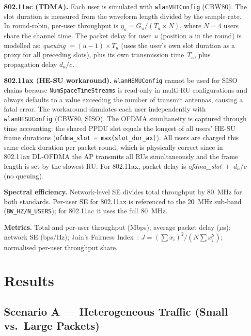 \documentclass[twocolumn]{article}
\begin{document}
\textbf{802.11ac (TDMA).}
Each user is simulated with \texttt{wlanVHTConfig} (CBW80). The slot
duration is measured from the waveform length divided by the sample rate.
In round-robin, per-user throughput is $\eta_u = G_u / (T_u \times N)$,
where $N=4$ users share the channel time. The packet delay for user~$u$
(position $u$ in the round) is modelled as:
\textit{queuing} $= (u-1) \times T_u$ (uses the user's own slot duration
as a proxy for all preceding slots), plus its own transmission time~$T_u$,
plus propagation delay $d_u/c$.

\textbf{802.11ax (HE-SU workaround).}
\texttt{wlanHEMUConfig} cannot be used for SISO chains because
\texttt{NumSpaceTimeStreams} is read-only in multi-RU configurations and
always defaults to a value exceeding the number of transmit antennas, causing
a fatal error. The workaround simulates each user independently with
\texttt{wlanHESUConfig} (CBW80, SISO). The OFDMA simultaneity is captured
through time accounting: the shared PPDU slot equals the longest of all
users' HE-SU frame durations (\texttt{ofdma\_slot = max(slot\_dur\_ax)}).
All users are charged this same clock duration per packet round, which is
physically correct since in 802.11ax DL-OFDMA the AP transmits all RUs
simultaneously and the frame length is set by the slowest RU. For 802.11ax,
packet delay is \textit{ofdma\_slot}~$+$~$d_u/c$ (no queuing).

\textbf{Spectral efficiency.}
Network-level SE divides total throughput by 80~MHz for both standards.
Per-user SE for 802.11ax is referenced to the 20~MHz sub-band
(\texttt{BW\_HZ/N\_USERS}); for 802.11ac it uses the full 80~MHz.

\textbf{Metrics.}
Total and per-user throughput (Mbps); average packet delay ($\mu$s);
network SE (bps/Hz); Jain's Fairness Index~\cite{jain1984}:
$J = (\sum x_i)^2 / (N \sum x_i^2)$; normalised per-user throughput share.

\section{Results}

\subsection*{Scenario A --- Heterogeneous Traffic (Small vs.\ Large Packets)}
\end{document}
